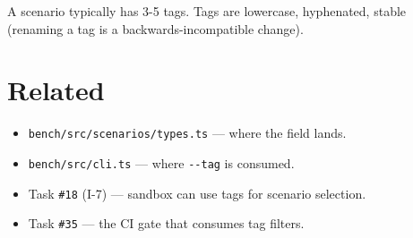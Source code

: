 A scenario typically has 3-5 tags. Tags are lowercase, hyphenated, stable (renaming a tag is a backwards-incompatible change).

\section{Related}\label{record-323-related}

\begin{itemize}
\tightlist
\item
  \texttt{b\allowbreak{}e\allowbreak{}n\allowbreak{}c\allowbreak{}h\allowbreak{}/\allowbreak{}s\allowbreak{}r\allowbreak{}c\allowbreak{}/\allowbreak{}s\allowbreak{}c\allowbreak{}e\allowbreak{}n\allowbreak{}a\allowbreak{}r\allowbreak{}i\allowbreak{}o\allowbreak{}s\allowbreak{}/\allowbreak{}t\allowbreak{}y\allowbreak{}p\allowbreak{}e\allowbreak{}s\allowbreak{}.\allowbreak{}t\allowbreak{}s} --- where the field lands.
\item
  \texttt{b\allowbreak{}e\allowbreak{}n\allowbreak{}c\allowbreak{}h\allowbreak{}/\allowbreak{}s\allowbreak{}r\allowbreak{}c\allowbreak{}/\allowbreak{}c\allowbreak{}l\allowbreak{}i\allowbreak{}.\allowbreak{}t\allowbreak{}s} --- where \texttt{-\allowbreak{}-\allowbreak{}t\allowbreak{}a\allowbreak{}g} is consumed.
\item
  Task \texttt{\#\allowbreak{}1\allowbreak{}8} (I-7) --- sandbox can use tags for scenario selection.
\item
  Task \texttt{\#\allowbreak{}3\allowbreak{}5} --- the CI gate that consumes tag filters.
\end{itemize}

